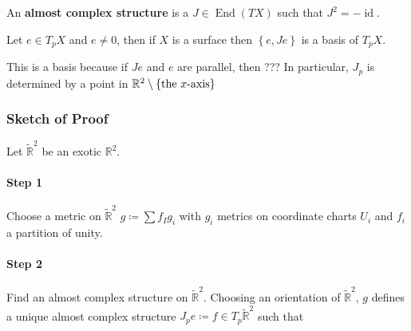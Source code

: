 \begin{definition}

An \textbf{almost complex structure} is a
\(J\in \mathop{\mathrm{End}}(TX)\) such that
\(J^2 = -\operatorname{id}\).

\end{definition}

\begin{remark}

Let \(e\in T_p X\) and \(e\neq 0\), then if \(X\) is a surface then
\(\left\{{e, Je}\right\}\) is a basis of \(T_p X\).

\begin{figure}
\centering
{}
\end{figure}

This is a basis because if \(Je\) and \(e\) are parallel, then ??? In
particular, \(J_p\) is determined by a point in
\({\mathbb{R}}^2\setminus\left\{{\text{the }x{\hbox{-}}\text{axis}}\right\}\)

\end{remark}

\hypertarget{sketch-of-proof}{%
\subsubsection{Sketch of Proof}\label{sketch-of-proof}}

Let \(\tilde {\mathbb{R}}^2\) be an exotic \({\mathbb{R}}^2\).

\hypertarget{step-1}{%
\paragraph{Step 1}\label{step-1}}

Choose a metric on \(\tilde {\mathbb{R}}^2\) \(g \coloneqq\sum f_I g_i\)
with \(g_i\) metrics on coordinate charts \(U_i\) and \(f_i\) a
partition of unity.

\hypertarget{step-2}{%
\paragraph{Step 2}\label{step-2}}

Find an almost complex structure on \(\tilde {\mathbb{R}}^2\). Choosing
an orientation of \(\tilde {\mathbb{R}}^2\), \(g\) defines a unique
almost complex structure
\(J_p e \coloneqq f\in T_p \tilde {\mathbb{R}}^2\) such that

